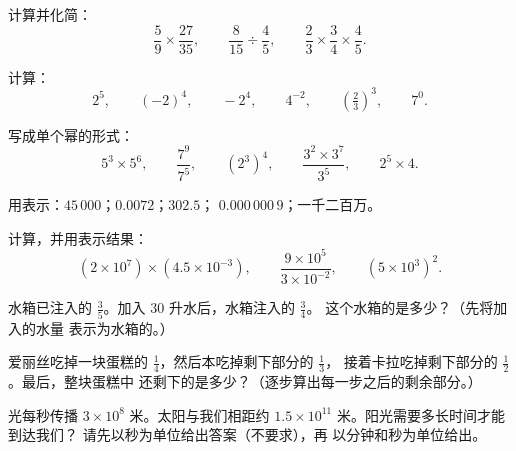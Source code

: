 \begin{exercise}[$\star$]\label{exo:g9:fractions:2}
计算并化简：
\[
\frac59 \times \frac{27}{35}, \qquad
\frac{8}{15} \div \frac{4}{5}, \qquad
\frac23 \times \frac34 \times \frac45 .
\]
\end{exercise}

\begin{exercise}[$\star$]\label{exo:g9:fractions:3}
计算：
\[
2^5, \qquad (-2)^4, \qquad -2^4, \qquad 4^{-2}, \qquad
\left(\tfrac23\right)^3, \qquad 7^0 .
\]
\end{exercise}

\begin{exercise}[$\star$]\label{exo:g9:fractions:4}
写成单个幂的形式：
\[
5^3 \times 5^6, \qquad
\frac{7^9}{7^5}, \qquad
\left(2^3\right)^4, \qquad
\frac{3^2 \times 3^7}{3^5}, \qquad
2^5 \times 4 .
\]
\end{exercise}

\begin{exercise}[$\star$]\label{exo:g9:fractions:5}
用表示：$45\,000$；$0.0072$；$302.5$；
$0.000\,000\,9$；一千二百万。
\end{exercise}

\begin{exercise}[$\star\star$]\label{exo:g9:fractions:6}
计算，并用表示结果：
\[
(2 \times 10^7) \times (4.5 \times 10^{-3}),
\qquad
\frac{9 \times 10^5}{3 \times 10^{-2}},
\qquad
(5 \times 10^3)^2 .
\]
\end{exercise}

\begin{exercise}[$\star\star$]\label{exo:g9:fractions:7}
水箱已注入的 $\frac35$。加入 $30$ 升水后，水箱注入的 $\frac34$。
这个水箱的是多少？（先将加入的水量
表示为水箱的。）
\end{exercise}

\begin{exercise}[$\star\star$]\label{exo:g9:fractions:8}
爱丽丝吃掉一块蛋糕的 $\frac14$，然后本吃掉剩下部分的 $\frac13$，
接着卡拉吃掉剩下部分的 $\frac12$。最后，整块蛋糕中
还剩下的是多少？（逐步算出每一步之后的剩余部分。）
\end{exercise}

\begin{exercise}[$\star\star$]\label{exo:g9:fractions:9}
光每秒传播 $3 \times 10^8$ 米。太阳与我们相距约
$1.5 \times 10^{11}$ 米。阳光需要多长时间才能到达我们？
请先以秒为单位给出答案（不要求），再
以分钟和秒为单位给出。
\end{exercise}


